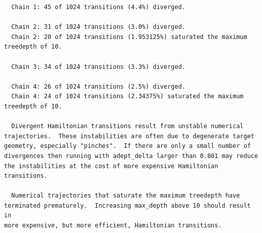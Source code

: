\documentclass[
  letterpaper,
  DIV=11,
  numbers=noendperiod]{scrartcl}
\newenvironment{Shaded}{\begin{snugshade}}{\end{snugshade}}
\newcommand{\AttributeTok}[1]{\textcolor[rgb]{0.40,0.45,0.13}{#1}}
\newcommand{\ConstantTok}[1]{\textcolor[rgb]{0.56,0.35,0.01}{#1}}
\newcommand{\FunctionTok}[1]{\textcolor[rgb]{0.28,0.35,0.67}{#1}}
\newcommand{\NormalTok}[1]{\textcolor[rgb]{0.00,0.23,0.31}{#1}}
\newcommand{\OtherTok}[1]{\textcolor[rgb]{0.00,0.23,0.31}{#1}}
\newcommand{\SpecialCharTok}[1]{\textcolor[rgb]{0.37,0.37,0.37}{#1}}
\newcommand{\StringTok}[1]{\textcolor[rgb]{0.13,0.47,0.30}{#1}}
\begin{document}
\begin{verbatim}
  Chain 1: 45 of 1024 transitions (4.4%) diverged.

  Chain 2: 31 of 1024 transitions (3.0%) diverged.
  Chain 2: 20 of 1024 transitions (1.953125%) saturated the maximum treedepth of 10.

  Chain 3: 34 of 1024 transitions (3.3%) diverged.

  Chain 4: 26 of 1024 transitions (2.5%) diverged.
  Chain 4: 24 of 1024 transitions (2.34375%) saturated the maximum treedepth of 10.

  Divergent Hamiltonian transitions result from unstable numerical
trajectories.  These instabilities are often due to degenerate target
geometry, especially "pinches".  If there are only a small number of
divergences then running with adept_delta larger than 0.801 may reduce
the instabilities at the cost of more expensive Hamiltonian
transitions.

  Numerical trajectories that saturate the maximum treedepth have
terminated prematurely.  Increasing max_depth above 10 should result in
more expensive, but more efficient, Hamiltonian transitions.
\end{verbatim}

\begin{Shaded}
\end{Shaded}
\end{document}

